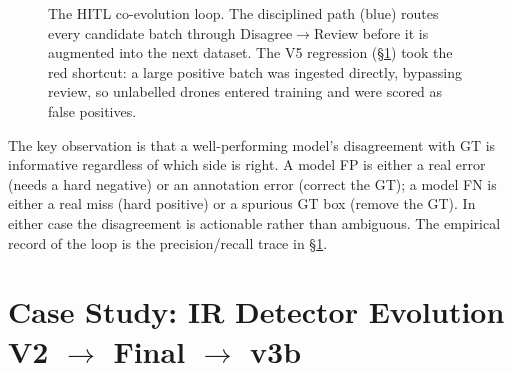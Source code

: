\documentclass[12pt,a4paper,oneside,openright]{book}
\begin{document}
\begin{figure}[htbp]
    \centering
    \caption{The HITL co-evolution loop. The disciplined path (blue) routes every candidate batch through Disagree$\rightarrow$Review before it is augmented into the next dataset. The V5 regression (\S\ref{sec:ir_evolution}) took the red shortcut: a large positive batch was ingested directly, bypassing review, so unlabelled drones entered training and were scored as false positives.}
    \label{fig:hitl_loop}
\end{figure}

The key observation is that a well-performing model's disagreement with GT is informative regardless of which side is right. A model FP is either a real error (needs a hard negative) or an annotation error (correct the GT); a model FN is either a real miss (hard positive) or a spurious GT box (remove the GT). In either case the disagreement is actionable rather than ambiguous. The empirical record of the loop is the precision/recall trace in \S\ref{sec:ir_evolution}.

\section{Case Study: IR Detector Evolution V2 $\to$ Final $\to$ v3b}
\label{sec:ir_evolution}
\end{document}
